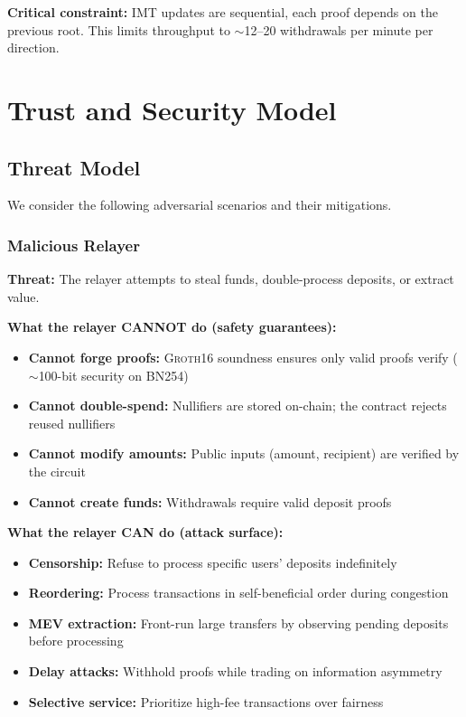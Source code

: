 \documentclass[11pt,a4paper,twoside]{article}
\newcommand{\groth}{\textsc{Groth16}}
\begin{document}
\textbf{Critical constraint:} IMT updates are sequential, each proof depends on the previous root. This limits throughput to $\sim$12--20 withdrawals per minute per direction.

\section{Trust and Security Model}
\label{sec:security}

\subsection{Threat Model}

We consider the following adversarial scenarios and their mitigations.

\subsubsection{Malicious Relayer}

\textbf{Threat:} The relayer attempts to steal funds, double-process deposits, or extract value.

\textbf{What the relayer CANNOT do (safety guarantees):}
\begin{itemize}
    \item \textbf{Cannot forge proofs:} \groth{} soundness ensures only valid proofs verify ($\sim$100-bit security on BN254)
    \item \textbf{Cannot double-spend:} Nullifiers are stored on-chain; the contract rejects reused nullifiers
    \item \textbf{Cannot modify amounts:} Public inputs (amount, recipient) are verified by the circuit
    \item \textbf{Cannot create funds:} Withdrawals require valid deposit proofs
\end{itemize}

\textbf{What the relayer CAN do (attack surface):}
\begin{itemize}
    \item \textbf{Censorship:} Refuse to process specific users' deposits indefinitely
    \item \textbf{Reordering:} Process transactions in self-beneficial order during congestion
    \item \textbf{MEV extraction:} Front-run large transfers by observing pending deposits before processing
    \item \textbf{Delay attacks:} Withhold proofs while trading on information asymmetry
    \item \textbf{Selective service:} Prioritize high-fee transactions over fairness
\end{itemize}
\end{document}
